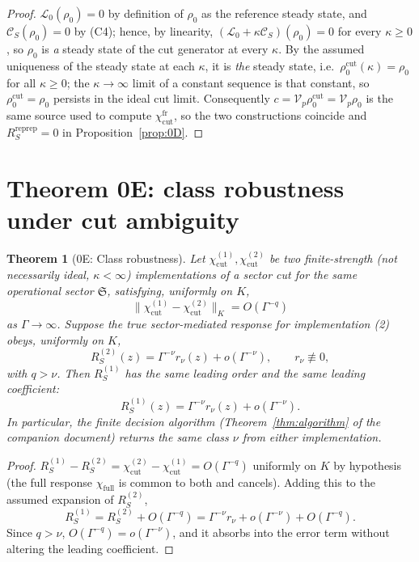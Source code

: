 \documentclass[11pt]{article}
\newtheorem{theorem}{Theorem}[section]
\renewcommand{\S}{\mathfrak S}
\begin{document}
\begin{proof}
$\mathcal L_0(\rho_0)=0$ by definition of $\rho_0$ as the reference
steady state, and $\mathcal C_S(\rho_0)=0$ by (C4); hence, by linearity,
$(\mathcal L_0+\kappa\mathcal C_S)(\rho_0)=0$ for every $\kappa\ge0$, so
$\rho_0$ is \emph{a} steady state of the cut generator at every $\kappa$.
By the assumed uniqueness of the steady state at each $\kappa$, it is
\emph{the} steady state, i.e.\ $\rho_0^{\mathrm{cut}}(\kappa)=\rho_0$ for
all $\kappa\ge0$; the $\kappa\to\infty$ limit of a constant sequence is
that constant, so $\rho_0^{\mathrm{cut}}=\rho_0$ persists in the ideal cut
limit. Consequently $c=\mathcal V_p\rho_0^{\mathrm{cut}}=\mathcal V_p\rho_0$
is the same source used to compute $\chi_{\mathrm{cut}}^{\mathrm{fr}}$, so
the two constructions coincide and $R_S^{\mathrm{reprep}}=0$ in
Proposition~\ref{prop:0D}.
\end{proof}

\section{Theorem 0E: class robustness under cut ambiguity}

\begin{theorem}[0E: Class robustness]
\label{thm:0E}
Let $\chi_{\mathrm{cut}}^{(1)},\chi_{\mathrm{cut}}^{(2)}$ be two finite-strength
(not necessarily ideal, $\kappa<\infty$) implementations of a sector cut
for the same operational sector $\S$, satisfying, uniformly on $K$,
\[
\bigl\|\chi_{\mathrm{cut}}^{(1)}-\chi_{\mathrm{cut}}^{(2)}\bigr\|_K=O(\Gamma^{-q})
\]
as $\Gamma\to\infty$. Suppose the true sector-mediated response for
implementation (2) obeys, uniformly on $K$,
\[
R_S^{(2)}(z)=\Gamma^{-\nu}r_\nu(z)+o(\Gamma^{-\nu}),
\qquad r_\nu\not\equiv0,
\]
with $q>\nu$. Then $R_S^{(1)}$ has the same leading order and the same
leading coefficient:
\[
R_S^{(1)}(z)=\Gamma^{-\nu}r_\nu(z)+o(\Gamma^{-\nu}).
\]
In particular, the finite decision algorithm (Theorem~\ref{thm:algorithm}
of the companion document) returns the same class $\nu$ from either
implementation.
\end{theorem}

\begin{proof}
$R_S^{(1)}-R_S^{(2)}=\chi_{\mathrm{cut}}^{(2)}-\chi_{\mathrm{cut}}^{(1)}
=O(\Gamma^{-q})$ uniformly on $K$ by hypothesis (the full response
$\chi_{\mathrm{full}}$ is common to both and cancels). Adding this to the
assumed expansion of $R_S^{(2)}$,
\[
R_S^{(1)}=R_S^{(2)}+O(\Gamma^{-q})
=\Gamma^{-\nu}r_\nu+o(\Gamma^{-\nu})+O(\Gamma^{-q}).
\]
Since $q>\nu$, $O(\Gamma^{-q})=o(\Gamma^{-\nu})$, and it absorbs into the
error term without altering the leading coefficient.
\end{proof}
\end{document}
